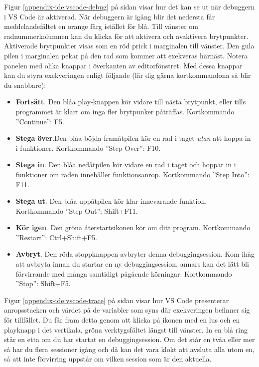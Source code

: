 Figur \ref{appendix-ide:vscode-debug} på sidan \pageref{appendix-ide:vscode-debug} visar hur det kan se ut när debuggern i VS Code är aktiverad. När debuggern är igång blir det nedersta får meddelandefältet en orange färg istället för blå. Till vänster om radnummerkolumnen kan du klicka för att aktivera och avaktivera brytpunkter. Aktiverade brytpunkter visas som en röd prick i marginalen till vänster. Den gula pilen i marginalen pekar på den rad som kommer att exekveras härnäst. Notera panelen med olika knappar i överkanten av editorfönstret. Med dessa knappar kan du styra exekveringen enligt följande (lär dig gärna kortkommandona så blir du snabbare):
\begin{itemize}
  \item \textbf{Fortsätt}. Den blåa play-knappen kör vidare till nästa brytpunkt, eller tills programmet är klart om inga fler brytpunker påträffas. Kortkommando ''Continue'': F5.
  \item \textbf{Stega över}.Den blåa böjda framåtpilen kör en rad i taget \emph{utan} att hoppa in i funktioner.  Kortkommando ''Step Over'': F10.
  \item \textbf{Stega in}. Den blåa nedåtpilen kör vidare en rad i taget och hoppar in i funktioner om raden innehåller funktionsanrop. Kortkommando ''Step Into'': F11.
  \item \textbf{Stega ut}. Den blåa uppåtpilen kör klar innevarande funktion. Kortkommando ''Step Out'': Shift+F11.
  \item \textbf{Kör igen}. Den gröna återstartsikonen kör om ditt program. Kortkommando ''Restart'': Ctrl+Shift+F5.
  \item \textbf{Avbryt}. Den röda stoppknappen avbryter denna debuggingsession. Kom ihåg att avbryta innan du startar en ny debuggingsession, annars kan det lätt bli förvirrande med många samtidigt pågående körningar. Kortkommando ''Stop'': Shift+F5. 
\end{itemize}

Figur \ref{appendix-ide:vscode-trace} på sidan \pageref{appendix-ide:vscode-trace} visar hur VS Code presenterar anropsstacken och värdet på de variabler som syns där exekveringen befinner sig för tillfället. Du får fram detta genom att klicka på ikonen med en lus och en playknapp i det vertikala, gröna verktygsfältet längst till vänster. In en blå ring står en etta om du har startat en debuggingsession. Om det står en tvåa eller mer så har du flera sessioner igång och då kan det vara klokt att avsluta alla utom en, så att inte förvirring uppstår om vilken session som är den aktuella. 

